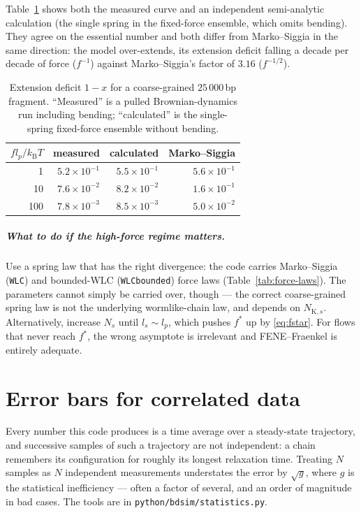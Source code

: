\documentclass[11pt,a4paper]{report}
\newcommand{\kB}{k_\mathrm{B}}
\newcommand{\code}[1]{\texttt{\seqsplitcode{#1}}}
\newcommand{\seqsplitcode}[1]{#1}
\begin{document}
Table~\ref{tab:fe} shows both the measured curve and an independent
semi-analytic calculation (the single spring in the fixed-force ensemble, which
omits bending). They agree on the essential number and both differ from
Marko--Siggia in the same direction: the model over-extends, its extension deficit
falling a decade per decade of force ($f^{-1}$) against Marko--Siggia's factor of
$3.16$ ($f^{-1/2}$).

\begin{table}[ht]
\centering
\caption{Extension deficit $1-x$ for a coarse-grained $25\,000$\,bp fragment.
``Measured'' is a pulled Brownian-dynamics run including bending; ``calculated''
is the single-spring fixed-force ensemble without bending.}
\label{tab:fe}
\begin{tabular}{@{}rrrr@{}}
\toprule
$f l_p/\kB T$ & measured & calculated & Marko--Siggia \\
\midrule
1   & $5.2\times10^{-1}$ & $5.5\times10^{-1}$ & $5.6\times10^{-1}$ \\
10  & $7.6\times10^{-2}$ & $8.2\times10^{-2}$ & $1.6\times10^{-1}$ \\
100 & $7.8\times10^{-3}$ & $8.5\times10^{-3}$ & $5.0\times10^{-2}$ \\
\bottomrule
\end{tabular}
\end{table}

\paragraph{What to do if the high-force regime matters.} Use a spring law that has
the right divergence: the code carries Marko--Siggia (\code{WLC}) and bounded-WLC
(\code{WLCbounded}) force laws (Table~\ref{tab:force-laws}). The parameters cannot
simply be carried over, though --- the correct coarse-grained spring law is not the
underlying wormlike-chain law, and depends on $N_{\mathrm{K},s}$. Alternatively,
increase $N_s$ until $l_s\sim l_p$, which pushes $f^{*}$ up by
\eqref{eq:fstar}. For flows that never reach $f^{*}$, the wrong asymptote is
irrelevant and FENE--Fraenkel is entirely adequate.


\chapter{Error bars for correlated data}
\label{ch:statistics}

Every number this code produces is a time average over a steady-state trajectory,
and successive samples of such a trajectory are not independent: a chain remembers
its configuration for roughly its longest relaxation time. Treating $N$ samples as
$N$ independent measurements understates the error by $\sqrt{g}$, where $g$ is the
statistical inefficiency --- often a factor of several, and an order of magnitude
in bad cases. The tools are in \code{python/bdsim/statistics.py}.
\end{document}
